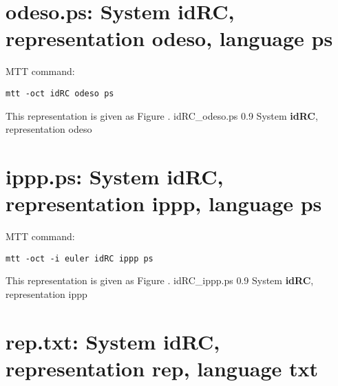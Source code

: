 \section{\textbf{odeso.ps}: System idRC, representation \textbf{odeso}, language \textbf{ps}}
\label{sec:idRC_odeso.ps}


MTT command:
\begin{verbatim}
mtt -oct idRC odeso ps 
\end{verbatim}
This representation is given as Figure .
    {idRC_odeso.ps}
    {0.9}
    {System \textbf{idRC}, representation odeso}


\section{\textbf{ippp.ps}: System idRC, representation \textbf{ippp}, language \textbf{ps}}
\label{sec:idRC_ippp.ps}


MTT command:
\begin{verbatim}
mtt -oct -i euler idRC ippp ps 
\end{verbatim}
This representation is given as Figure .
    {idRC_ippp.ps}
    {0.9}
    {System \textbf{idRC}, representation ippp}


\section{\textbf{rep.txt}: System idRC, representation \textbf{rep}, language \textbf{txt}}
\label{sec:idRC_rep.txt}


